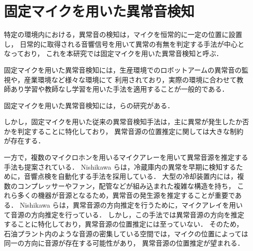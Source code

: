 \documentclass[../main]{subfiles}
\begin{document}
\section{固定マイクを用いた異常音検知}
\label{sec:anomaly}
特定の環境内における，異常音の検知は，マイクを恒常的に一定の位置に設置し，
日常的に取得される音響信号を用いて異常の有無を判定する手法が中心となっており，
これを本研究では固定マイクを用いた異常音検知と呼ぶ．


固定マイクを用いた異常音検知には，生産環境でのロボットアームの異常音の監視や，産業環境など様々な環境にて
利用されており，実際の環境に合わせて教師あり学習や教師なし学習を用いた手法を適用することが一般的である．

固定マイクを用いた異常音検知には，らの研究がある．

しかし，固定マイクを用いた従来の異常音検知手法は，主に異常が発生したか否かを判定することに特化しており，
異常音源の位置推定に関しては大きな制約が存在する．

一方で，複数のマイクロホンを用いるマイクアレーを用いて異常音源を推定する手法も提案されている．
Nishikawa らは，冷蔵庫内の異常を早期に検知するために，音響点検を自動化する手法を採用している．
大型の冷却装置内には，複数のコンプレッサーやファン，配管などが組み込まれた複雑な構造を持ち，
これら多くの機器が音源となるため，異常音の発生源を推定することが重要である．
Nishikawa らは，異常音源の方向推定を行うために，マイクアレイを用いて音源の方向推定を行っている．
しかし，この手法では異常音源の方向を推定することに特化しており，異常音源の位置推定には至っていない．
そのため，石油プラント内のような音源の密集している空間では，マイクの位置によっては同一の方向に音源が存在する可能性があり，
異常音源の位置推定が望まれる．
\end{document}
